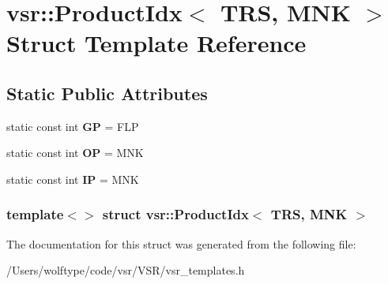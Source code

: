 \hypertarget{structvsr_1_1_product_idx_3_01_t_r_s_00_01_m_n_k_01_4}{\section{vsr\-:\-:Product\-Idx$<$ T\-R\-S, M\-N\-K $>$ Struct Template Reference}
\label{structvsr_1_1_product_idx_3_01_t_r_s_00_01_m_n_k_01_4}
}
\subsection*{Static Public Attributes}
\begin{DoxyCompactItemize}
\item 
\hypertarget{structvsr_1_1_product_idx_3_01_t_r_s_00_01_m_n_k_01_4_a993dbd1b5920975c941c524b990ba94a}{static const int {\bfseries G\-P} = F\-L\-P}\label{structvsr_1_1_product_idx_3_01_t_r_s_00_01_m_n_k_01_4_a993dbd1b5920975c941c524b990ba94a}

\item 
\hypertarget{structvsr_1_1_product_idx_3_01_t_r_s_00_01_m_n_k_01_4_a3b60b531de7b34e782a2742a13a1f807}{static const int {\bfseries O\-P} = M\-N\-K}\label{structvsr_1_1_product_idx_3_01_t_r_s_00_01_m_n_k_01_4_a3b60b531de7b34e782a2742a13a1f807}

\item 
\hypertarget{structvsr_1_1_product_idx_3_01_t_r_s_00_01_m_n_k_01_4_ae59cf911209773681b8b53f91e8eaee7}{static const int {\bfseries I\-P} = M\-N\-K}\label{structvsr_1_1_product_idx_3_01_t_r_s_00_01_m_n_k_01_4_ae59cf911209773681b8b53f91e8eaee7}

\end{DoxyCompactItemize}
\subsubsection*{template$<$$>$ struct vsr\-::\-Product\-Idx$<$ T\-R\-S, M\-N\-K $>$}



The documentation for this struct was generated from the following file\-:\begin{DoxyCompactItemize}
\item 
/\-Users/wolftype/code/vsr/\-V\-S\-R/vsr\-\_\-templates.\-h\end{DoxyCompactItemize}
